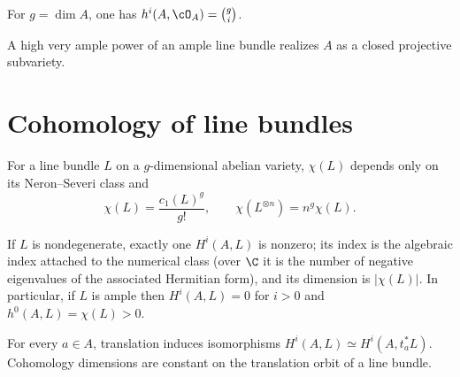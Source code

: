 \begin{corollary}
\label{mumford3-h0-structure-cohomology}
For $g=\dim A$, one has $h^i(A,\cO_A)=\binom gi$.
\notready
\end{corollary}

\begin{corollary}
\label{mumford3-projectivity-consequence}
A high very ample power of an ample line bundle realizes $A$ as a closed
projective subvariety.
\notready
\end{corollary}

\section[Cohomology of line bundles]{Cohomology of line bundles}
\label{mumford-III16}

\begin{proposition}
\label{mumford-prop-euler-line-bundle}
For a line bundle $L$ on a $g$-dimensional abelian variety, $\chi(L)$ depends
only on its Neron--Severi class and
\[
 \chi(L)=\frac{c_1(L)^g}{g!},\qquad \chi(L^{\otimes n})=n^g\chi(L).
\]
\notready
\end{proposition}

\begin{theorem}
\label{mumford-thm-line-bundle-index}
If $L$ is nondegenerate, exactly one $H^i(A,L)$ is nonzero; its index is the
algebraic index attached to the numerical class (over $\C$ it is the number of
negative eigenvalues of the associated Hermitian form), and its
dimension is $|\chi(L)|$.  In particular, if $L$ is ample then
$H^i(A,L)=0$ for $i>0$ and $h^0(A,L)=\chi(L)>0$.
\notready
\end{theorem}

\begin{corollary}
\label{mumford-cor-translation-cohomology}
For every $a\in A$, translation induces isomorphisms
$H^i(A,L)\simeq H^i(A,t_a^*L)$.  Cohomology dimensions are constant on the
translation orbit of a line bundle.
\notready
\end{corollary}

